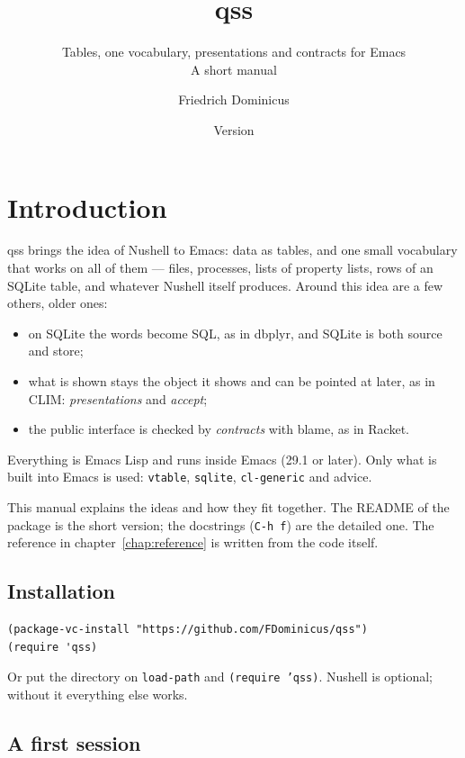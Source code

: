 \documentclass[
  paper=a4, fontsize=11pt, parskip=half, headings=small,
  toc=bibliography, numbers=noenddot, DIV=12
]{scrreprt}
\title{qss}
\subtitle{Tables, one vocabulary, presentations and contracts for Emacs\\[1ex]
  \normalsize A short manual}
\author{Friedrich Dominicus}
\date{Version \qssversion}
\newcommand{\code}[1]{\texttt{#1}}
\newcommand{\kbd}[1]{\texttt{#1}}
\newcommand{\qss}{\textsf{qss}}
\begin{document}
\maketitle
\tableofcontents

\chapter{Introduction}

\qss{} brings the idea of Nushell to Emacs: data as tables, and one small
vocabulary that works on all of them --- files, processes, lists of property
lists, rows of an SQLite table, and whatever Nushell itself produces. Around
this idea are a few others, older ones:

\begin{itemize}
\item on SQLite the words become SQL, as in dbplyr, and SQLite is both
  source and store;
\item what is shown stays the object it shows and can be pointed at later, as
  in CLIM: \emph{presentations} and \emph{accept};
\item the public interface is checked by \emph{contracts} with blame, as in
  Racket.
\end{itemize}

Everything is Emacs Lisp and runs inside Emacs (29.1 or later). Only what is
built into Emacs is used: \code{vtable}, \code{sqlite}, \code{cl-generic} and
advice.

This manual explains the ideas and how they fit together. The README of the
package is the short version; the docstrings (\kbd{C-h f}) are the detailed
one. The reference in chapter~\ref{chap:reference} is written from the code
itself.

\section{Installation}

\begin{lstlisting}
(package-vc-install "https://github.com/FDominicus/qss")
(require 'qss)
\end{lstlisting}

Or put the directory on \code{load-path} and \code{(require 'qss)}. Nushell is
optional; without it everything else works.

\section{A first session}
\end{document}
